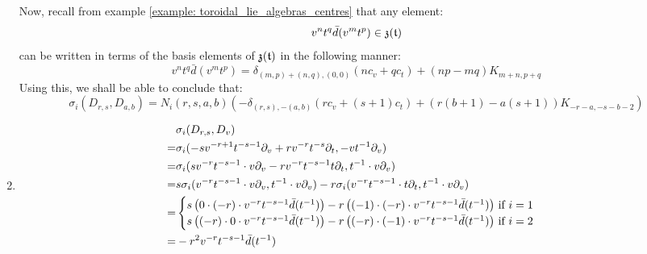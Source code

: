 \begin{example}
\begin{enumerate}
                Now, recall from example \ref{example: toroidal_lie_algebras_centres} that any element:
                    $$v^n t^q \bar{d}(v^m t^p) \in \mathfrak{z}(\mathfrak{t})$$
                can be written in terms of the basis elements of $\mathfrak{z}(\mathfrak{t})$ in the following manner:
                    $$v^n t^q \bar{d}(v^m t^p) = \delta_{(m, p) + (n, q), (0, 0)} ( n c_v + q c_t ) + (np - mq) K_{m + n, p + q}$$
                Using this, we shall be able to conclude that:
                    $$\sigma_i(D_{r, s}, D_{a, b}) = N_i(r, s, a, b) \left( -\delta_{(r, s), -(a, b)} (r c_v + (s + 1) c_t) + ( r(b + 1) - a(s + 1) )K_{-r - a, -s - b - 2} \right)$$
                \item
                    $$
                        \begin{aligned}
                            & \sigma_i(D_{r, s}, D_v)
                            \\
                            = & \sigma_i( -s v^{-r + 1} t^{-s - 1} \partial_v + r v^{-r} t^{-s} \partial_t, -v t^{-1} \partial_v )
                            \\
                            = & \sigma_i( s v^{-r} t^{-s - 1} \cdot v \partial_v - r v^{-r} t^{-s - 1} t \partial_t, t^{-1} \cdot v \partial_v )
                            \\
                            = & s \sigma_i( v^{-r} t^{-s - 1} \cdot v \partial_v, t^{-1} \cdot v \partial_v ) - r\sigma_i( v^{-r} t^{-s - 1} \cdot t \partial_t, t^{-1} \cdot v \partial_v )
                            \\
                            = &
                            \begin{cases}
                                \text{$s \left( 0 \cdot (-r) \cdot v^{-r} t^{-s - 1} \bar{d}(t^{-1}) \right) - r \left( (-1) \cdot (-r) \cdot v^{-r} t^{-s - 1} \bar{d}(t^{-1}) \right)$ if $i = 1$}
                                \\
                                \text{$s \left( (-r) \cdot 0 \cdot v^{-r} t^{-s - 1} \bar{d}(t^{-1}) \right) - r \left( (-r) \cdot (-1) \cdot v^{-r} t^{-s - 1} \bar{d}(t^{-1}) \right)$ if $i = 2$}
                            \end{cases}
                            \\
                            = & -r^2 v^{-r} t^{-s - 1} \bar{d}(t^{-1})
                        \end{aligned}
$$
\end{enumerate}
\end{example}
